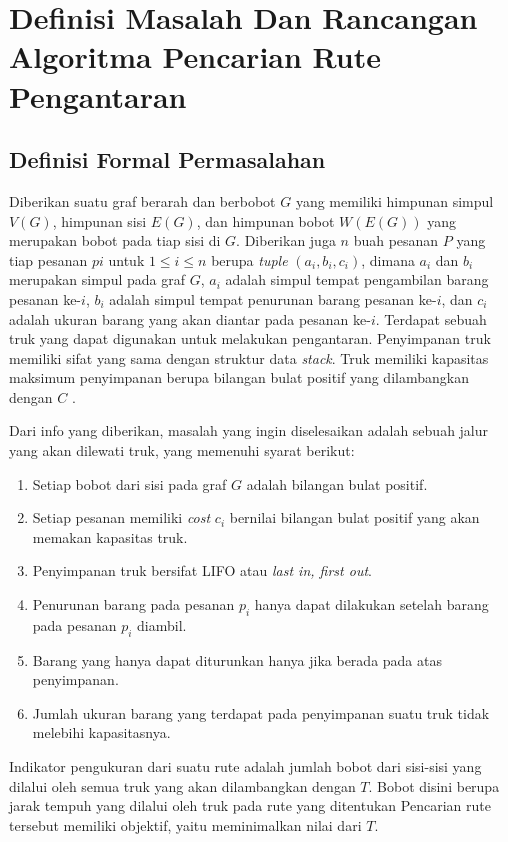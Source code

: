 \chapter{Definisi Masalah Dan Rancangan Algoritma Pencarian Rute Pengantaran}

\section{Definisi Formal Permasalahan}

Diberikan suatu graf berarah dan berbobot $G$ yang memiliki himpunan simpul $V(G)$, himpunan sisi $E(G)$, dan himpunan bobot $W(E(G))$ yang merupakan 
bobot pada tiap sisi di $G$. Diberikan juga $n$ buah pesanan $P$ yang tiap pesanan $pi$ untuk $1 \leq i \leq n$ berupa \textit{tuple} $(a_{i}, b_{i}, c_{i})$, 
dimana $a_{i}$ dan $b_{i}$ merupakan simpul pada graf $G$, $a_{i}$ adalah simpul tempat pengambilan barang pesanan ke-$i$, $b_{i}$ adalah simpul tempat penurunan 
barang pesanan ke-$i$, dan $c_{i}$ adalah ukuran barang yang akan diantar pada pesanan ke-$i$. Terdapat sebuah truk yang dapat digunakan untuk melakukan pengantaran.
Penyimpanan truk memiliki sifat yang sama dengan struktur data \textit{stack}. Truk memiliki kapasitas maksimum penyimpanan 
berupa bilangan bulat positif yang dilambangkan dengan $C$ .

Dari info yang diberikan, masalah yang ingin diselesaikan adalah sebuah jalur yang akan dilewati truk, yang memenuhi syarat berikut:
\begin{enumerate}
    \item Setiap bobot dari sisi pada graf $G$ adalah bilangan bulat positif.
    \item Setiap pesanan memiliki \textit{cost} $c_{i}$ bernilai bilangan bulat positif yang akan memakan kapasitas truk.
    \item Penyimpanan truk bersifat LIFO atau \textit{last in, first out}.
    \item Penurunan barang pada pesanan $p_{i}$ hanya dapat dilakukan setelah barang pada pesanan $p_{i}$ diambil.
    \item Barang yang hanya dapat diturunkan hanya jika berada pada atas penyimpanan.
    \item Jumlah ukuran barang yang terdapat pada penyimpanan suatu truk tidak melebihi kapasitasnya.
\end{enumerate}

Indikator pengukuran dari suatu rute adalah jumlah bobot dari sisi-sisi yang dilalui oleh semua truk yang akan dilambangkan dengan $T$. 
Bobot disini berupa jarak tempuh yang dilalui oleh truk pada rute yang ditentukan
Pencarian rute tersebut memiliki objektif, yaitu meminimalkan nilai dari $T$.

